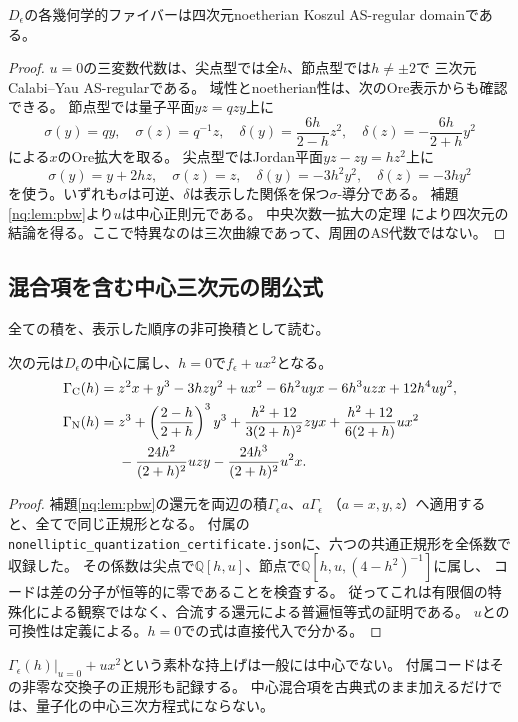 \begin{lemma}[幾何学的ファイバーの正則性]\label{nq:lem:regular4}
$D_\epsilon$の各幾何学的ファイバーは四次元noetherian Koszul AS-regular domainである。
\end{lemma}
\begin{proof}
$u=0$の三変数代数は、尖点型では全$h$、節点型では$h\ne\pm2$で
三次元Calabi--Yau AS-regularである\cite[Lemma 4.1, Theorem 4.2]{PMoriSmith}。
域性とnoetherian性は、次のOre表示からも確認できる。
節点型では量子平面$yz=qzy$上に
\begin{equation}
 \sigma(y)=qy,\quad\sigma(z)=q^{-1}z,\quad
 \delta(y)=\frac{6h}{2-h}z^2,\quad
 \delta(z)=-\frac{6h}{2+h}y^2
\end{equation}
による$x$のOre拡大を取る。
尖点型ではJordan平面$yz-zy=hz^2$上に
\begin{equation}
 \sigma(y)=y+2hz,\quad\sigma(z)=z,\quad
 \delta(y)=-3h^2y^2,\quad\delta(z)=-3hy^2
\end{equation}
を使う。いずれも$\sigma$は可逆、$\delta$は表示した関係を保つ$\sigma$-導分である。
補題\ref{nq:lem:pbw}より$u$は中心正則元である。
中央次数一拡大の定理\cite[Theorem 2.6, Corollary 2.7 and Remark 2.8]{LBSVNE12}
により四次元の結論を得る。ここで特異なのは三次曲線であって、周囲のAS代数ではない。
\end{proof}

\subsection{混合項を含む中心三次元の閉公式}
全ての積を、表示した順序の非可換積として読む。
\begin{proposition}[第一ブロックの中心元]\label{nq:prop:center}
次の元は$D_\epsilon$の中心に属し、$h=0$で$f_\epsilon+ux^2$となる。
\begin{align}
 \Gamma_{\mathrm C}(h)={}&
 z^2x+y^3-3hzy^2+ux^2
 -6h^2uyx-6h^3uzx+12h^4uy^2,
 \label{nq:eq:centerC}\\
 \Gamma_{\mathrm N}(h)={}&
 z^3+\left(\frac{2-h}{2+h}\right)^3y^3
 +\frac{h^2+12}{3(2+h)^2}zyx
 +\frac{h^2+12}{6(2+h)}ux^2\notag\\
 &-\frac{24h^2}{(2+h)^2}uzy
 -\frac{24h^3}{(2+h)^2}u^2x.
 \label{nq:eq:centerN}
\end{align}
\end{proposition}
\begin{proof}
補題\ref{nq:lem:pbw}の還元を両辺の積$\Gamma_\epsilon a$、$a\Gamma_\epsilon$
（$a=x,y,z$）へ適用すると、全てで同じ正規形となる。
付属の\texttt{nonelliptic\_quantization\_certificate.json}に、六つの共通正規形を全係数で収録した。
その係数は尖点で$\mathbb Q[h,u]$、節点で$\mathbb Q[h,u,(4-h^2)^{-1}]$に属し、
コードは差の分子が恒等的に零であることを検査する。
従ってこれは有限個の特殊化による観察ではなく、合流する還元による普遍恒等式の証明である。
$u$との可換性は定義による。$h=0$での式は直接代入で分かる。
\end{proof}
\begin{remark}[量子的な混合補正の必要性]
$\Gamma_\epsilon(h)|_{u=0}+ux^2$という素朴な持上げは一般には中心でない。
付属コードはその非零な交換子の正規形も記録する。
中心混合項を古典式のまま加えるだけでは、量子化の中心三次方程式にならない。
\end{remark}

